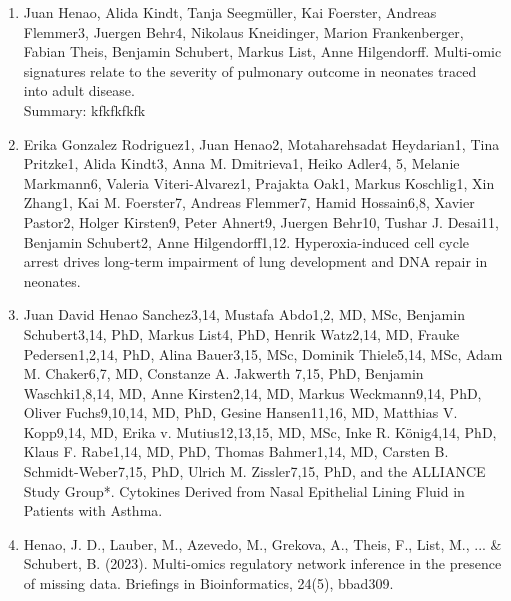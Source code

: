 \begin{enumerate}
	\item Juan Henao, Alida Kindt, Tanja Seegmüller, Kai Foerster, Andreas Flemmer3, Juergen Behr4, Nikolaus Kneidinger, Marion Frankenberger, Fabian Theis, Benjamin Schubert, Markus List, Anne Hilgendorff. Multi-omic signatures relate to the severity of pulmonary outcome in neonates traced into adult disease.\\
	
	Summary: kfkfkfkfk	
	
	\item Erika Gonzalez Rodriguez1, Juan Henao2, Motaharehsadat Heydarian1, Tina Pritzke1, Alida Kindt3, Anna M. Dmitrieva1, Heiko Adler4, 5, Melanie Markmann6, Valeria Viteri-Alvarez1, Prajakta Oak1, Markus Koschlig1, Xin Zhang1, Kai M. Foerster7, Andreas Flemmer7, Hamid Hossain6,8, Xavier Pastor2, Holger Kirsten9, Peter Ahnert9, Juergen Behr10, Tushar J. Desai11, Benjamin Schubert2, Anne Hilgendorff1,12. Hyperoxia-induced cell cycle arrest drives long-term impairment of lung development and DNA repair in neonates.
	
	\item 	Juan David Henao Sanchez3,14, Mustafa Abdo1,2, MD, MSc, Benjamin Schubert3,14, PhD, Markus List4, PhD, Henrik Watz2,14, MD, Frauke Pedersen1,2,14, PhD, Alina Bauer3,15, MSc, Dominik Thiele5,14, MSc, Adam M. Chaker6,7, MD, Constanze A. Jakwerth 7,15, PhD, Benjamin Waschki1,8,14, MD, Anne Kirsten2,14, MD, Markus Weckmann9,14, PhD, Oliver Fuchs9,10,14, MD, PhD, Gesine Hansen11,16, MD, Matthias V. Kopp9,14, MD, Erika v. Mutius12,13,15, MD, MSc, Inke R. König4,14, PhD, Klaus F.  Rabe1,14, MD, PhD, Thomas Bahmer1,14, MD, Carsten B. Schmidt-Weber7,15, PhD, Ulrich M. Zissler7,15, PhD, and the ALLIANCE Study Group*. Cytokines Derived from Nasal Epithelial Lining Fluid in Patients with Asthma.
	
	\item Henao, J. D., Lauber, M., Azevedo, M., Grekova, A., Theis, F., List, M., ... \& Schubert, B. (2023). Multi-omics regulatory network inference in the presence of missing data. Briefings in Bioinformatics, 24(5), bbad309. 
\end{enumerate}